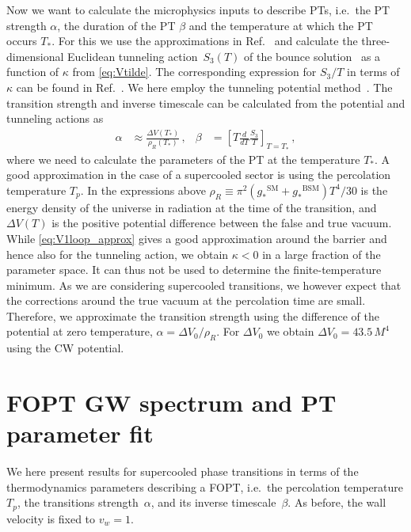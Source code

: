 \documentclass{article}
\newcommand*{\rhoR}{\ensuremath{\rho_{R}}\xspace}
\newcommand*{\geff}{\ensuremath{g_{*}}\xspace}
\begin{document}
Now we want to calculate the microphysics inputs to describe PTs, i.e.\ the PT strength $\alpha$, the duration of the PT $\beta$ and the temperature at which the PT occurs $T_*$. 
For this we use the approximations in Ref.~\cite{Levi:2022bzt} and calculate the three-dimensional Euclidean tunneling action~$S_3(T)$ of the bounce solution~\cite{Coleman:1977py,Callan:1977pt,Linde:1980tt,Linde:1981zj} as a function of $\kappa$ from \cref{eq:Vtilde}.
The corresponding expression for $S_3/T$ in terms of $\kappa$ can be found in Ref.~\cite{Levi:2022bzt}.
We here employ the tunneling potential method~\cite{Espinosa:2018hue}.
The transition strength and inverse timescale can be calculated from the potential and tunneling actions as
\begin{align}
    \alpha &\approx \frac{\Delta V(T_*)}{\rho_R(T_*)} \,,&
    \beta &= \left[ T \frac{d}{dT} \frac{S_3}{T}\right]_{T=T_*} \,,
\end{align}
where we need to calculate the parameters of the PT at the temperature $T_*$. A good approximation in the case of a supercooled sector is using the percolation temperature $T_p$.
In the expressions above $\rhoR\equiv\pi^2(\geff^\mathrm{SM}+\geff^\mathrm{BSM}) T^4/30$ is the energy density of the universe in radiation at the time of the transition, and $\Delta V(T)$ is the positive potential difference between the false and true vacuum. 
While \cref{eq:V1loop_approx} gives a good approximation around the barrier and hence also for the tunneling action, we obtain $\kappa<0$ in a large fraction of the parameter space.
It can thus not be used to determine the finite-temperature minimum.
As we are considering supercooled transitions, we however expect that the corrections around the true vacuum at the percolation time are small.
Therefore, we approximate the transition strength using the  difference of the potential at zero temperature, $\alpha = \Delta V_0/\rhoR$. For $\Delta V_0$ we obtain $\Delta V_0 =43.5\,M^4$~\cite{Levi:2022bzt} using the CW potential.

\section{FOPT GW spectrum and PT parameter fit}
\label{app:FOPT_SGWB}

We here present results for supercooled phase transitions in terms of the thermodynamics parameters describing a FOPT, i.e.\ the percolation temperature $T_p$, the transitions strength~$\alpha$, and its inverse timescale~$\beta$.
As before, the wall velocity is fixed to $v_w=1$.
\end{document}
